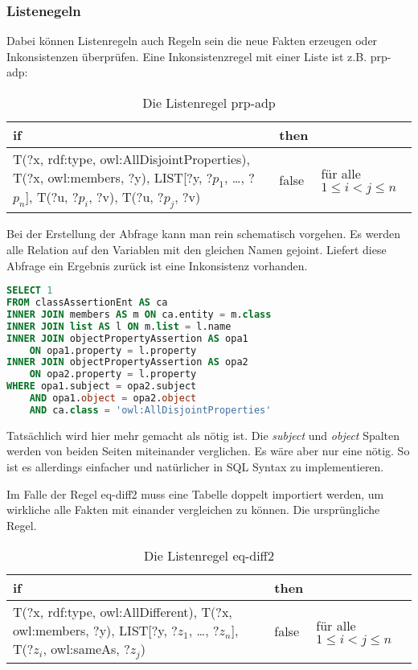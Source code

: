 \subsubsection{Listenegeln}
Dabei können Listenregeln auch Regeln sein die neue Fakten erzeugen oder Inkonsistenzen überprüfen. Eine Inkonsistenzregel mit einer Liste ist z.B. prp-adp:
\begin{table}[htb]
\begin{center}
	\begin{tabular}{M{7.5cm}|M{1.2cm}|M{2.5cm}}
	if & then & \\ \hline
	T(?x, rdf:type, owl:AllDisjointProperties),\newline
	T(?x, owl:members, ?y),\newline
	LIST[?y, ?$p_1$, \ldots, ?$p_n$],\newline
	T(?u, ?$p_i$, ?v),\newline
	T(?u, ?$p_j$, ?v) & false & für alle $1 \leq i < j \leq n$
	\end{tabular}
\end{center}
	\caption{Die Listenregel prp-adp}
	\label{rule-prp-adp}
\end{table}


Bei der Erstellung der Abfrage kann man rein schematisch vorgehen. Es werden alle Relation auf den Variablen mit den gleichen Namen gejoint. Liefert diese Abfrage ein Ergebnis zurück ist eine Inkonsistenz vorhanden.

\begin{lstlisting}[language=SQL]
SELECT 1
FROM classAssertionEnt AS ca
INNER JOIN members AS m ON ca.entity = m.class
INNER JOIN list AS l ON m.list = l.name
INNER JOIN objectPropertyAssertion AS opa1
	ON opa1.property = l.property
INNER JOIN objectPropertyAssertion AS opa2
	ON opa2.property = l.property
WHERE opa1.subject = opa2.subject
	AND opa1.object = opa2.object
	AND ca.class = 'owl:AllDisjointProperties'
\end{lstlisting}

Tatsächlich wird hier mehr gemacht als nötig ist. Die \emph{subject} und \emph{object} Spalten werden von beiden Seiten miteinander verglichen. Es wäre aber nur eine nötig. So ist es allerdings einfacher und natürlicher in SQL Syntax zu implementieren.

Im Falle der Regel eq-diff2 muss eine Tabelle doppelt importiert werden, um wirkliche alle Fakten mit einander vergleichen zu können. Die ursprüngliche Regel.
\begin{table}[htb]
\begin{center}
	\begin{tabular}{M{7cm}|M{1.2cm}|M{2.5cm}}
	if & then & \\ \hline
	T(?x, rdf:type, owl:AllDifferent),\newline
	T(?x, owl:members, ?y),\newline
	LIST[?y, ?$z_1$, \ldots, ?$z_n$],\newline
	T(?$z_i$, owl:sameAs, ?$z_j$) & false & für alle $1 \leq i < j \leq n$
	\end{tabular}
\end{center}
	\caption{Die Listenregel eq-diff2}
	\label{rule-eq-diff2}
\end{table}


